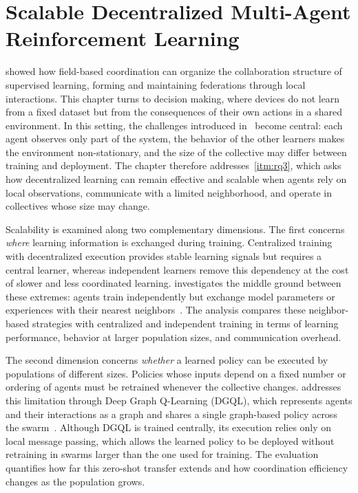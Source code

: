 
\chapter[Scalable Decentralized MARL]{Scalable Decentralized Multi-Agent Reinforcement Learning}
\label{chap:scalable-rl}
\minitoc

 showed how field-based coordination can organize
 the collaboration structure of supervised learning,
 forming and maintaining federations through local interactions.
This chapter turns to decision making,
 where devices do not learn from a fixed dataset
 but from the consequences of their own actions in a shared environment.
In this setting,
 the challenges introduced in~ become central:
 each agent observes only part of the system,
 the behavior of the other learners makes the environment non-stationary,
 and the size of the collective may differ between training and deployment.
The chapter therefore addresses~\ref{itm:rq3},
 which asks how decentralized learning can remain effective and scalable
 when agents rely on local observations,
 communicate with a limited neighborhood,
 and operate in collectives whose size may change.

Scalability is examined along two complementary dimensions.
The first concerns \emph{where} learning information is exchanged during training.
Centralized training with decentralized execution provides stable learning signals
 but requires a central learner,
 whereas independent learners remove this dependency
 at the cost of slower and less coordinated learning.
 investigates the middle ground between these extremes:
 agents train independently but exchange model parameters or experiences
 with their nearest neighbors~\cite{DBLP:conf/sac/MalucelliDAV25}.
The analysis compares these neighbor-based strategies with centralized and independent training
 in terms of learning performance, behavior at larger population sizes, and communication overhead.

The second dimension concerns \emph{whether} a learned policy can be executed
 by populations of different sizes.
Policies whose inputs depend on a fixed number or ordering of agents
 must be retrained whenever the collective changes.
 addresses this limitation through Deep Graph Q-Learning (DGQL),
 which represents agents and their interactions as a graph
 and shares a single graph-based policy across the swarm~\cite{DBLP:journals/ai/AguzziDVV26}.
Although DGQL is trained centrally,
 its execution relies only on local message passing,
 which allows the learned policy to be deployed without retraining
 in swarms larger than the one used for training.
The evaluation quantifies how far this zero-shot transfer extends
 and how coordination efficiency changes as the population grows.

